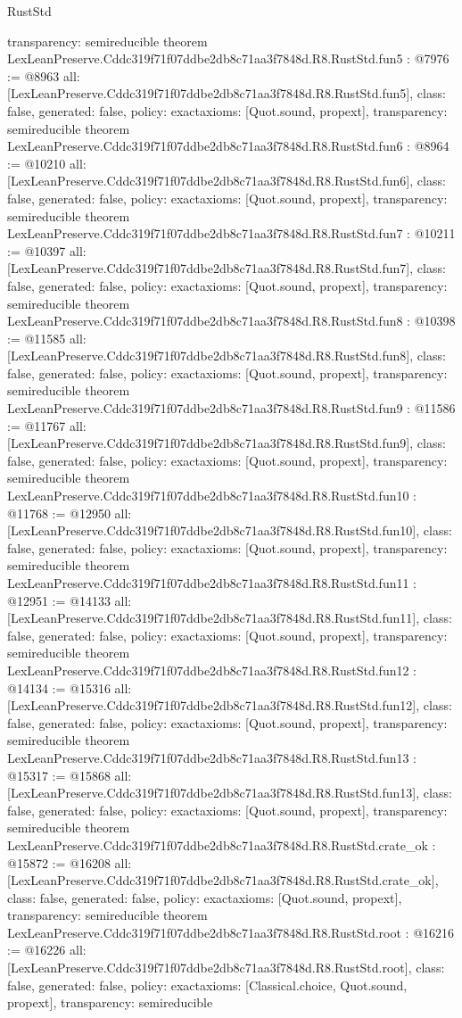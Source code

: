 \begin{lexlean}{RustStd}
\begin{coremodule}
{  transparency: semireducible
}
theorem LexLeanPreserve.Cddc319f71f07ddbe2db8c71aa3f7848d.R8.RustStd.fun5 : @7976 := @8963 {
  all: [LexLeanPreserve.Cddc319f71f07ddbe2db8c71aa3f7848d.R8.RustStd.fun5],
  class: false,
  generated: false,
  policy: exact{axioms: [Quot.sound, propext]},
  transparency: semireducible
}
theorem LexLeanPreserve.Cddc319f71f07ddbe2db8c71aa3f7848d.R8.RustStd.fun6 : @8964 := @10210 {
  all: [LexLeanPreserve.Cddc319f71f07ddbe2db8c71aa3f7848d.R8.RustStd.fun6],
  class: false,
  generated: false,
  policy: exact{axioms: [Quot.sound, propext]},
  transparency: semireducible
}
theorem LexLeanPreserve.Cddc319f71f07ddbe2db8c71aa3f7848d.R8.RustStd.fun7 : @10211 := @10397 {
  all: [LexLeanPreserve.Cddc319f71f07ddbe2db8c71aa3f7848d.R8.RustStd.fun7],
  class: false,
  generated: false,
  policy: exact{axioms: [Quot.sound, propext]},
  transparency: semireducible
}
theorem LexLeanPreserve.Cddc319f71f07ddbe2db8c71aa3f7848d.R8.RustStd.fun8 : @10398 := @11585 {
  all: [LexLeanPreserve.Cddc319f71f07ddbe2db8c71aa3f7848d.R8.RustStd.fun8],
  class: false,
  generated: false,
  policy: exact{axioms: [Quot.sound, propext]},
  transparency: semireducible
}
theorem LexLeanPreserve.Cddc319f71f07ddbe2db8c71aa3f7848d.R8.RustStd.fun9 : @11586 := @11767 {
  all: [LexLeanPreserve.Cddc319f71f07ddbe2db8c71aa3f7848d.R8.RustStd.fun9],
  class: false,
  generated: false,
  policy: exact{axioms: [Quot.sound, propext]},
  transparency: semireducible
}
theorem LexLeanPreserve.Cddc319f71f07ddbe2db8c71aa3f7848d.R8.RustStd.fun10 : @11768 := @12950 {
  all: [LexLeanPreserve.Cddc319f71f07ddbe2db8c71aa3f7848d.R8.RustStd.fun10],
  class: false,
  generated: false,
  policy: exact{axioms: [Quot.sound, propext]},
  transparency: semireducible
}
theorem LexLeanPreserve.Cddc319f71f07ddbe2db8c71aa3f7848d.R8.RustStd.fun11 : @12951 := @14133 {
  all: [LexLeanPreserve.Cddc319f71f07ddbe2db8c71aa3f7848d.R8.RustStd.fun11],
  class: false,
  generated: false,
  policy: exact{axioms: [Quot.sound, propext]},
  transparency: semireducible
}
theorem LexLeanPreserve.Cddc319f71f07ddbe2db8c71aa3f7848d.R8.RustStd.fun12 : @14134 := @15316 {
  all: [LexLeanPreserve.Cddc319f71f07ddbe2db8c71aa3f7848d.R8.RustStd.fun12],
  class: false,
  generated: false,
  policy: exact{axioms: [Quot.sound, propext]},
  transparency: semireducible
}
theorem LexLeanPreserve.Cddc319f71f07ddbe2db8c71aa3f7848d.R8.RustStd.fun13 : @15317 := @15868 {
  all: [LexLeanPreserve.Cddc319f71f07ddbe2db8c71aa3f7848d.R8.RustStd.fun13],
  class: false,
  generated: false,
  policy: exact{axioms: [Quot.sound, propext]},
  transparency: semireducible
}
theorem LexLeanPreserve.Cddc319f71f07ddbe2db8c71aa3f7848d.R8.RustStd.crate_ok : @15872 := @16208 {
  all: [LexLeanPreserve.Cddc319f71f07ddbe2db8c71aa3f7848d.R8.RustStd.crate_ok],
  class: false,
  generated: false,
  policy: exact{axioms: [Quot.sound, propext]},
  transparency: semireducible
}
theorem LexLeanPreserve.Cddc319f71f07ddbe2db8c71aa3f7848d.R8.RustStd.root : @16216 := @16226 {
  all: [LexLeanPreserve.Cddc319f71f07ddbe2db8c71aa3f7848d.R8.RustStd.root],
  class: false,
  generated: false,
  policy: exact{axioms: [Classical.choice, Quot.sound, propext]},
  transparency: semireducible
}


\end{coremodule}
\end{lexlean}
